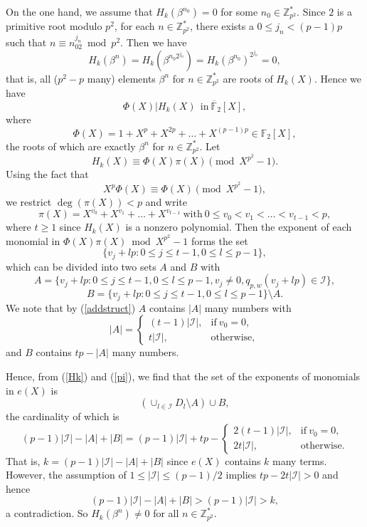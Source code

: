 \documentclass [11pt,a4paper]{article}
\def\F{\mathbb{F}}
\def\Z{\mathbb{Z}}
\begin{document}
On the one hand, we assume that $H_k(\beta^{n_0})=0$ for some $n_0\in \Z_{p^2}^*$. Since $2$ is a primitive root modulo $p^2$, for each $n\in\Z_{p^2}^*$, there exists a $0\le j_n<(p-1)p$ such that $n\equiv n_02^{j_n} \bmod {p^2}$. Then we have
$$
H_k(\beta^{n})=H_k(\beta^{n_0 2^{j_n}})=H_k(\beta^{n_0})^{2^{j_n}}=0,
$$
that is, all ($p^2-p$ many) elements $\beta^n$ for $n\in\Z_{p^2}^*$ are roots of $H_k(X)$. Hence we have
$$
\Phi(X)|H_k(X) ~~ \mathrm{in}~ \overline{\F}_2[X],
$$
where
$$
\Phi(X)=1+X^p+X^{2p}+\ldots+X^{(p-1)p}\in \F_2[X],
$$
the roots of which are exactly $\beta^n$ for $n\in\Z_{p^2}^*$.  Let
\begin{equation}\label{pi}
H_k(X)\equiv \Phi(X)\pi(X) \pmod {X^{p^2}-1}.
\end{equation}
Using the fact that
$$
X^p\Phi(X)  \equiv \Phi(X) \pmod {X^{p^2}-1},
$$
we restrict $\deg(\pi(X))<p$ and write
$$
\pi(X)=X^{v_0}+X^{v_1}+\ldots+X^{v_{t-1}} ~ \mathrm{with} ~ 0\le v_0<v_1<\ldots<v_{t-1}<p,
$$
where $t\ge 1$ since $H_k(X)$ is a nonzero polynomial. Then the exponent of each monomial in $\Phi(X)\pi(X) \bmod {X^{p^2}-1}$ forms the set
$$
\{v_j+lp : 0\le j\le t-1, 0\le l\le p-1\},
$$
which can be divided into two sets $A$ and $B$ with
$$
A=\{v_j+lp : 0\le j\le t-1, 0\le l\le p-1, v_j\neq 0, q_{p,w}(v_j+lp)\in \mathcal{I}\},
$$
$$
B=\{v_j+lp : 0\le j\le t-1, 0\le l\le p-1\}\setminus A.
$$
We note that by (\ref{addstruct}) $A$ contains $|A|$ many numbers with
$$
|A|=\left\{
\begin{array}{cl}
(t-1)|\mathcal{I}|, & \mathrm{if}~ v_0=0, \\
t|\mathcal{I}|, & \mathrm{otherwise},
\end{array}
\right.
$$
and $B$ contains $tp-|A|$ many numbers.

Hence, from (\ref{Hk}) and (\ref{pi}), we find that
the set of the exponents of monomials in $e(X)$ is
$$
( \cup_{l\in \mathcal{I}}D_l\setminus A)\cup B,
$$
the cardinality of which is
$$
(p-1)|\mathcal{I}|-|A|+|B|=(p-1)|\mathcal{I}|+tp-\left\{
\begin{array}{cl}
2(t-1)|\mathcal{I}|, & \mathrm{if}~ v_0=0, \\
2t|\mathcal{I}|, & \mathrm{otherwise}.
\end{array}
\right.
$$
That is, $k=(p-1)|\mathcal{I}|-|A|+|B|$ since $e(X)$ contains $k$ many terms. However, the
assumption of $1\le |\mathcal{I}|\le (p-1)/2$
implies $tp-2t|\mathcal{I}|>0$ and hence
$$
(p-1)|\mathcal{I}|-|A|+|B|>(p-1)|\mathcal{I}|>k,
$$
a contradiction.
So $H_k(\beta^{n})\neq 0$ for all $n\in \Z_{p^2}^*$.
\end{document}
